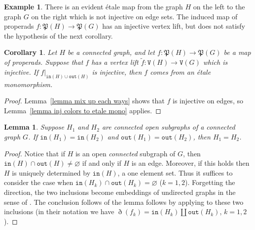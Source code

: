 \documentclass{amsart}
\numberwithin{theorem}{subsection}
\newtheorem{corollary}[theorem]{Corollary}
\newtheorem{lemma}[theorem]{Lemma}
\theoremstyle{definition}
\newtheorem{example}[theorem]{Example}
\newcommand{\out}{\mathtt{out}}
\newcommand{\inp}{\mathtt{in}}
\newcommand{\vertex}{\mathtt{V}}
\begin{document}
\begin{example}\label{ex etale not inj edges}
There is an evident \'etale map from the graph $H$ on the left to the graph $G$ on the right which is not injective on edge sets.
The induced map of properads $f : \mathfrak{P}(H) \to \mathfrak{P}(G)$ has an injective vertex lift, but does not satisfy the hypothesis of the next corollary.
\begin{center}
\end{center}
\end{example}

\begin{corollary}\label{cor vertex inclusion in out inclusion}
Let $H$ be a connected graph, and let $f  : \mathfrak{P}(H) \to \mathfrak{P}(G)$ be a map of properads.
Suppose that $f$ has a vertex lift $\widetilde f : \vertex(H) \to \vertex(G)$ which is injective.
If $f|_{\inp(H) \cup \out(H)}$ is injective, then $f$ comes from an \'etale monomorphism.
\end{corollary}
\begin{proof}
Lemma~\ref{lemma mix up each ways} shows that $f$ is injective on edges, so Lemma~\ref{lemma inj colors to etale mono} applies.
\end{proof}


\begin{lemma}
\label{lemma in and out determination}
Suppose $H_1$ and $H_2$ are connected open subgraphs of a connected graph $G$.
If $\inp(H_1) = \inp(H_2)$ and $\out(H_1) = \out(H_2)$, then $H_1=H_2$.
\end{lemma}
\begin{proof}
Notice that if $H$ is an open \emph{connected} subgraph of $G$, then $\inp(H) \cap \out(H) \neq \varnothing$ if and only if $H$ is an edge.
Moreover, if this holds then $H$ is uniquely determined by $\inp(H)$, a one element set.
Thus it suffices to consider the case when $\inp(H_k) \cap \out(H_k) = \varnothing$ ($k=1,2$).
Forgetting the direction, the two inclusions become embeddings of undirected graphs in the sense of \cite{HackneyRobertsonYau:GCHMO}. 
The conclusion follows of the lemma follows by applying \cite[Proposition 1.25]{HackneyRobertsonYau:GCHMO} to these two inclusions (in their notation we have $\eth(f_k) = \inp(H_k) \amalg \out(H_k)$, $k=1,2$).
\end{proof}
\end{document}
